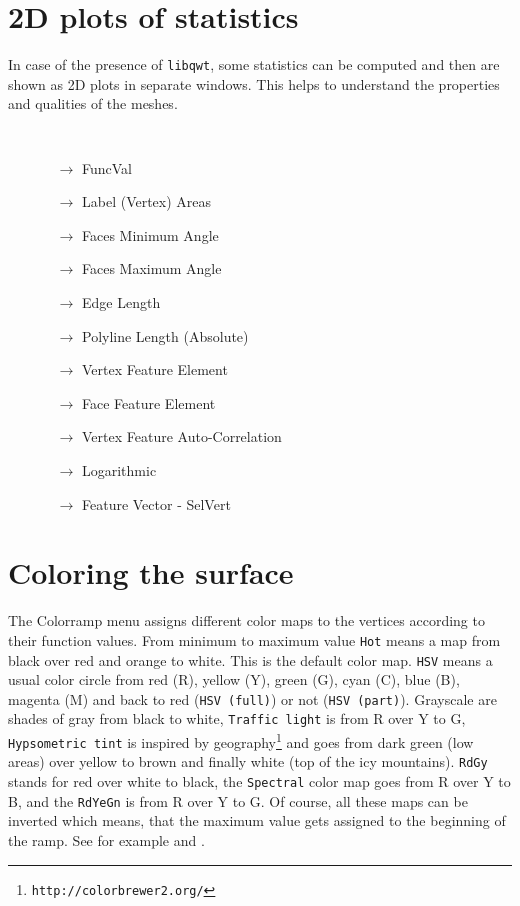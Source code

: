 \section{2D plots of statistics}\label{histogram} 
In case of the presence of {\tt libqwt}, some statistics can be computed and then are shown as 2D plots in separate windows. This helps to understand the properties and qualities of the meshes.
{\tt
\begin{itemize}
\item[] 
 \begin{itemize}
 \item[$\rightarrow$] FuncVal
 \item[$\rightarrow$] Label (Vertex) Areas
 \item[$\rightarrow$] Faces Minimum Angle
 \item[$\rightarrow$] Faces Maximum Angle
 \item[$\rightarrow$] Edge Length
 \item[$\rightarrow$] Polyline Length (Absolute)
 \color{gray}
 \item[$\rightarrow$] Vertex Feature Element
 \item[$\rightarrow$] Face Feature Element 
 \color{black}
 \item[$\rightarrow$] Vertex Feature Auto-Correlation
 \item[$\rightarrow$] Logarithmic 
 \color{gray}
 \item[$\rightarrow$] Feature Vector - SelVert
 \color{black}
 \end{itemize}
 \end{itemize}
 }


\section{Coloring the surface}\label{color}
The Colorramp menu assigns different color maps to the vertices according to their function values. From minimum to maximum value {\tt Hot} means a map from black over red and orange to white. This is the default color map. {\tt HSV} means a usual color circle from red (R), yellow (Y), green (G), cyan (C), blue (B), magenta (M) and back to red ({\tt HSV (full)}) or not ({\tt HSV (part)}). Grayscale are shades of gray from black to white, {\tt Traffic light} is from R over Y to G, {\tt Hypsometric tint} is inspired by geography\footnote{\tt http://colorbrewer2.org/} and goes from dark green (low areas) over yellow to brown and finally white (top of the icy mountains). {\tt RdGy} stands for red over white to black, the {\tt Spectral} color map goes from R over Y to B, and the {\tt RdYeGn} is from R over Y to G. Of course, all these maps can be inverted which means, that the maximum value gets assigned to the beginning of the ramp. See for example \cite{mara03a} and \cite{brewer03a}.

